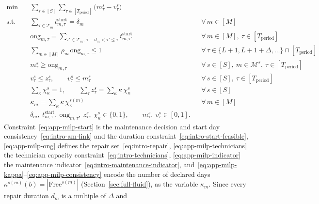 \documentclass{article}
\begin{document}
\begin{subequations}
\label{eq:app-milp}
\begin{align}
\min \quad & \sum_{s \in [S]} \sum_{\tau \in [T_{\mathrm{period}}]} \big(m^s_\tau - v^s_\tau\big)
\label{eq:app-milp-obj}\\
\text{s.t.} \quad
& \sum_{\tau \in \mathcal{T}_m} t^{\mathrm{start}}_{m,\tau} = \delta_m
&& \forall\, m \in [M]
\label{eq:app-milp-start}\\
& \mathrm{ong}_{m,\tau} = \sum_{\tau' \in \mathcal{T}_m,\ \tau - d_m < \tau' \le \tau} t^{\mathrm{start}}_{m,\tau'}
&& \forall\, m \in [M],\ \tau \in [T_{\mathrm{period}}]
\label{eq:app-milp-ong}\\
& \sum_{m \in [M]} \rho_m\, \mathrm{ong}_{m,\tau} \le 1
&& \forall\, \tau \in \{L+1, L+1+\Delta, \ldots\} \cap [T_{\mathrm{period}}]
\label{eq:app-milp-technicians}\\
& m^s_\tau \ge \mathrm{ong}_{m,\tau}
&& \forall\, s \in [S],\ m \in \mathcal{M}^s,\ \tau \in [T_{\mathrm{period}}]
\label{eq:app-milp-indicator}\\
& v^s_\tau \le z^s_\tau, \qquad v^s_\tau \le m^s_\tau
&& \forall\, s \in [S],\ \tau \in [T_{\mathrm{period}}]
\label{eq:app-milp-free}\\
& \sum_{\kappa} \chi^s_\kappa = 1, \qquad
\sum_{\tau} z^s_\tau = \sum_{\kappa} \kappa\, \chi^s_\kappa
&& \forall\, s \in [S]
\label{eq:app-milp-kappa}\\
& \kappa_m = \sum_{\kappa} \kappa\, \chi^{s(m)}_\kappa
&& \forall\, m \in [M]
\label{eq:app-milp-consistency}\\
& \delta_m,\ t^{\mathrm{start}}_{m,\tau},\ \mathrm{ong}_{m,\tau},\ z^s_\tau,\ \chi^s_\kappa \in \{0,1\}, \qquad
m^s_\tau,\ v^s_\tau \in [0,1].
\nonumber
\end{align}
\end{subequations}
Constraint~\eqref{eq:app-milp-start} is the maintenance decision and start day consistency~\eqref{eq:intro-am-link}
and the duration constraint~\eqref{eq:intro-start-feasible}, \eqref{eq:app-milp-ong} defines the repair set~\eqref{eq:intro-repair},
\eqref{eq:app-milp-technicians} the technician capacity
constraint~\eqref{eq:intro-technicians}, \eqref{eq:app-milp-indicator} the maintenance
indicator~\eqref{eq:intro-maintenance-indicator}, and~\eqref{eq:app-milp-kappa}--\eqref{eq:app-milp-consistency} encode the number of declared days
$\kappa^{s(m)}(b) = |\text{Free}^{s(m)}|$ (Section~\ref{sec:full-fluid}), as the variable $\kappa_m$. Since every repair duration $d_m$ is a multiple of $\Delta$ and
\end{document}

